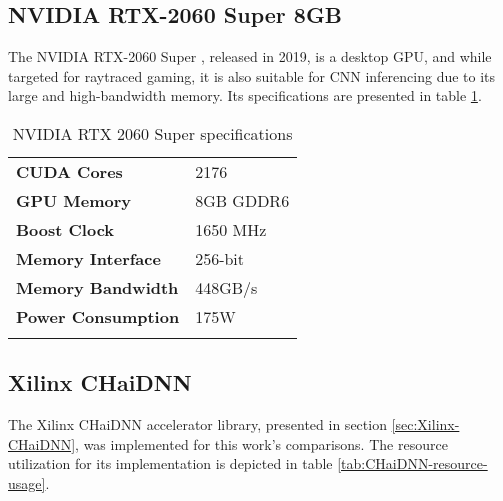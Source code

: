 
\subsection{NVIDIA RTX-2060 Super 8GB}
The NVIDIA RTX-2060 Super \cite{NVIDIA-RTX-2060-Super}, released in 2019, is a desktop GPU, and while targeted for raytraced gaming, it is also suitable for CNN inferencing due to its large and high-bandwidth memory. Its specifications are presented in table \ref{tab:NVIDIA-RTX-2060-Super-specs}.

\begin{table}[H]
	\caption{NVIDIA RTX 2060 Super specifications}
	\label{tab:NVIDIA-RTX-2060-Super-specs}
	\centering
	\begin{tabular}{ll}
		\toprule
		\textbf{CUDA Cores} & 2176\\
		\textbf{GPU Memory} & 8GB GDDR6\\
		\textbf{Boost Clock} & 1650 MHz\\
		\textbf{Memory Interface} & 256-bit\\
		\textbf{Memory Bandwidth} & 448GB/s\\
		\textbf{Power Consumption} & 175W\\
		\bottomrule\\
	\end{tabular}
\end{table}

\subsection{Xilinx CHaiDNN}
The Xilinx CHaiDNN accelerator library, presented in section \ref{sec:Xilinx-CHaiDNN}, was implemented for this work's comparisons. The resource utilization for its implementation is depicted in table \ref{tab:CHaiDNN-resource-usage}.

